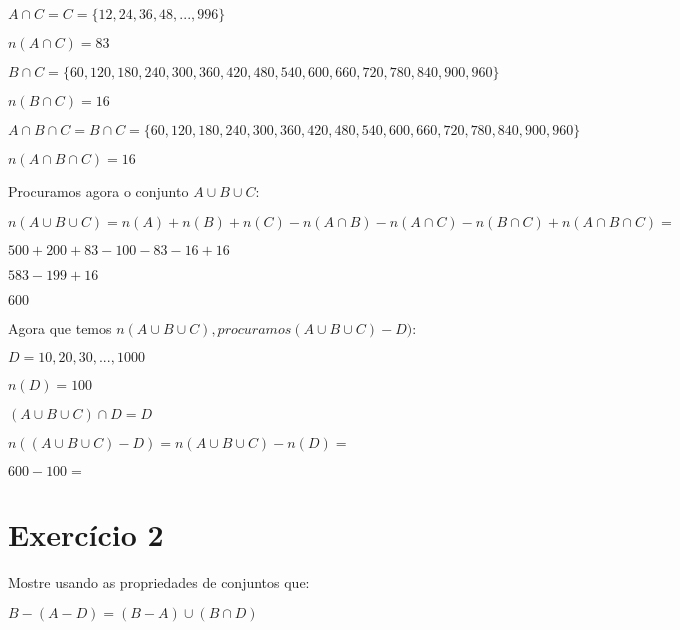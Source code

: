 \documentclass[12pt,a4paper]{article}
\begin{document}
$A \cap C = C = \{12, 24, 36, 48, ...,996\}$

$n(A \cap C) = 83$

$B \cap C = \{60, 120, 180, 240, 300, 360, 420, 480, 540, 600, 660, 720, 780, 840, 900, 960\}$

$n(B \cap C) = 16$

$A \cap B \cap C = B \cap C = \{60, 120, 180, 240, 300, 360, 420, 480, 540, 600, 660, 720, 780, 840, 900, 960\}$

$n(A \cap B \cap C) = 16$

Procuramos agora o conjunto $A \cup B \cup C$:

$ n(A \cup B \cup C) = n(A) + n(B) + n(C) - n(A \cap B) - n(A \cap C) - n(B \cap C) + n(A \cap B \cap C) =$

\indent $500 + 200 + 83 - 100 - 83 - 16 + 16$

$583 - 199 + 16$
			
$600$

Agora que temos $n(A \cup B \cup C), procuramos (A \cup B \cup C) - D)$:

$D = {10, 20, 30, ..., 1000}$

$n(D) = 100$

$(A \cup B \cup C) \cap D = D$

$n((A \cup B \cup C) - D) = n(A \cup B \cup C) - n(D) =$

$600 - 100=$\\
		
\newpage		   

\section{Exercício 2}

Mostre usando as propriedades de conjuntos que:

$B - (A - D) = (B - A) \cup (B \cap D)$
\end{document}
